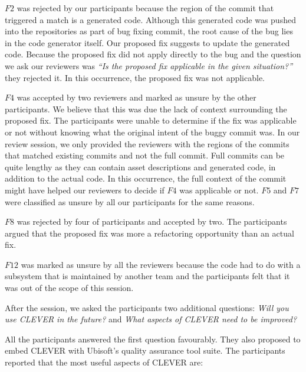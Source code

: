 \documentclass[12pt]{report}
\begin{document}
\(F2\) was rejected by our participants because the region of the commit
that triggered a match is a generated code. Although this generated code
was pushed into the repositories as part of bug fixing commit, the root
cause of the bug lies in the code generator itself. Our proposed fix
suggests to update the generated code. Because the proposed fix did not
apply directly to the bug and the question we ask our reviewers was
\emph{``Is the proposed fix applicable in the given situation?''} they
rejected it. In this occurrence, the proposed fix was not applicable.

\(F4\) was accepted by two reviewers and marked as unsure by the other
participants. We believe that this was due the lack of context
surrounding the proposed fix. The participants were unable to determine
if the fix was applicable or not without knowing what the original
intent of the buggy commit was. In our review session, we only provided
the reviewers with the regions of the commits that matched existing
commits and not the full commit. Full commits can be quite lengthy as
they can contain asset descriptions and generated code, in addition to
the actual code. In this occurrence, the full context of the commit
might have helped our reviewers to decide if \(F4\) was applicable or
not. \(F5\) and \(F7\) were classified as unsure by all our participants
for the same reasons.

\(F8\) was rejected by four of participants and accepted by two. The
participants argued that the proposed fix was more a refactoring
opportunity than an actual fix.

\(F12\) was marked as unsure by all the reviewers because the code had
to do with a subsystem that is maintained by another team and the
participants felt that it was out of the scope of this session.

After the session, we asked the participants two additional questions:
\emph{Will you use CLEVER in the future?} and \emph{What aspects of
CLEVER need to be improved?}

All the participants answered the first question favourably. They also
proposed to embed CLEVER with Ubisoft's quality assurance tool suite.
The participants reported that the most useful aspects of CLEVER are:
\end{document}
